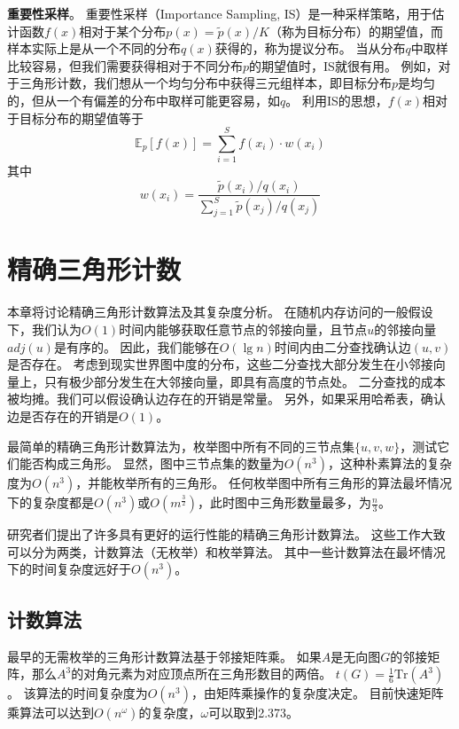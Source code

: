 \textbf{重要性采样}。
重要性采样（Importance Sampling, IS）是一种采样策略，用于估计函数$f(x)$相对于某个分布$p(x)=\tilde{p}(x)/K$（称为目标分布）的期望值，而样本实际上是从一个不同的分布$q(x)$获得的，称为提议分布。
当从分布$q$中取样比较容易，但我们需要获得相对于不同分布$p$的期望值时，IS就很有用。
例如，对于三角形计数，我们想从一个均匀分布中获得三元组样本，即目标分布$p$是均匀的，但从一个有偏差的分布中取样可能更容易，如$q$。
利用IS的思想，$f(x)$相对于目标分布的期望值等于
\begin{equation}
    \mathbb{E}_{p}[f(x)]=\sum_{i=1}^{S} f\left(x_{i}\right) \cdot w\left(x_{i}\right)
    \label{eq:IS}
\end{equation}
其中
\begin{equation}
    w\left(x_{i}\right)=\frac{\widetilde{p}\left(x_{i}\right) / q\left(x_{i}\right)}{\sum_{j=1}^{S} \tilde{p}\left(x_{j}\right) / q\left(x_{j}\right)}
\end{equation}


\chapter{精确三角形计数}
本章将讨论精确三角形计数算法及其复杂度分析。
在随机内存访问的一般假设下，我们认为$O(1)$时间内能够获取任意节点的邻接向量，且节点$u$的邻接向量$adj(u)$是有序的。
因此，我们能够在$O(\lg n)$时间内由二分查找确认边$(u,v)$是否存在。
考虑到现实世界图中度的分布，这些二分查找大部分发生在小邻接向量上，只有极少部分发生在大邻接向量，即具有高度的节点处。
二分查找的成本被均摊。我们可以假设确认边存在的开销是常量。
另外，如果采用哈希表，确认边是否存在的开销是$O(1)$。

最简单的精确三角形计数算法为，枚举图中所有不同的三节点集$\{u,v,w\}$，测试它们能否构成三角形。
显然，图中三节点集的数量为$O(n^{3})$，这种朴素算法的复杂度为$O(n^{3})$，并能枚举所有的三角形。
任何枚举图中所有三角形的算法最坏情况下的复杂度都是$O(n^{3})$或$O(m^{\frac{3}{2}})$，此时图中三角形数量最多，为$\frac{n}{3}$。

研究者们提出了许多具有更好的运行性能的精确三角形计数算法。
这些工作大致可以分为两类，计数算法（无枚举）和枚举算法。
其中一些计数算法在最坏情况下的时间复杂度远好于$O(n^{3})$。

\section{计数算法}
最早的无需枚举的三角形计数算法基于邻接矩阵乘。
如果$A$是无向图$G$的邻接矩阵，那么$A^{3}$的对角元素为对应顶点所在三角形数目的两倍。
$t(G)=\frac{1}{6}\text{Tr}(A^{3})$。 
该算法的时间复杂度为$O(n^{3})$，由矩阵乘操作的复杂度决定。
目前快速矩阵乘算法可以达到$O(n^{\omega})$的复杂度，$\omega$可以取到2.373\citep{le2014powers}。

